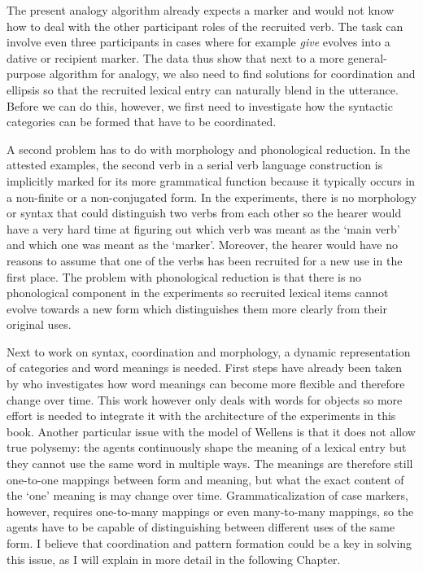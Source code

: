 The present analogy algorithm already expects a marker and would not know how to deal with the other participant roles of the recruited verb. The task can involve even three participants in cases where for example {\em give} evolves into a dative or recipient marker. The data thus show that next to a more general-purpose algorithm for analogy, we also need to find solutions for coordination and ellipsis so that the recruited lexical entry can naturally blend in the utterance. Before we can do this, however, we first need to investigate how the syntactic categories can be formed that have to be coordinated.

A second problem has to do with morphology and phonological reduction. In the attested examples, the second verb in a serial verb language construction is implicitly marked for its more grammatical function because it typically occurs in a non-finite or a non-conjugated form. In the experiments, there is no morphology or syntax that could distinguish two verbs from each other so the hearer would have a very hard time at figuring out which verb was meant as the `main verb' and which one was meant as the `marker'. Moreover, the hearer would have no reasons to assume that one of the verbs has been recruited for a new use in the first place. The problem with phonological reduction is that there is no phonological component in the experiments so recruited lexical items cannot evolve towards a new form which distinguishes them more clearly from their original uses.

Next to work on syntax, coordination and morphology, a dynamic representation of categories and word meanings is needed. First steps have already been taken by \citet{wellens08coping} who investigates how word meanings can become more flexible and therefore change over time. This work however only deals with words for objects so more effort is needed to integrate it with the architecture of the experiments in this book. Another particular issue with the model of Wellens is that it does not allow true polysemy: the agents continuously shape the meaning of a lexical entry but they cannot use the same word in multiple ways. The meanings are therefore still one-to-one mappings between form and meaning, but what the exact content of the `one' meaning is may change over time. Grammaticalization of case markers, however, requires one-to-many mappings or even many-to-many mappings, so the agents have to be capable of distinguishing between different uses of the same form. I believe that coordination and pattern formation could be a key in solving this issue, as I will explain in more detail in the following Chapter.
